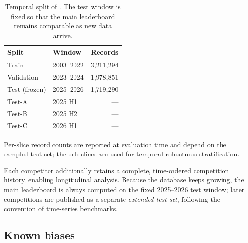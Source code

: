 \begin{table}[t]
  \centering
  \small
  \begin{threeparttable}
  \caption{Temporal split of \wcabench{}. The test window is fixed so that the
  main leaderboard remains comparable as new data arrive.}
  \label{tab:splits}
  \begin{tabular}{llr}
    \toprule
    Split & Window & Records \\
    \midrule
    Train & 2003--2022 & 3{,}211{,}294 \\
    Validation & 2023--2024 & 1{,}978{,}851 \\
    Test (frozen) & 2025--2026 & 1{,}719{,}290 \\
    \quad Test-A & 2025 H1 & --- \\
    \quad Test-B & 2025 H2 & --- \\
    \quad Test-C & 2026 H1 & --- \\
    \bottomrule
  \end{tabular}
  \begin{tablenotes}\footnotesize
    \item Per-slice record counts are reported at evaluation time and depend on
          the sampled test set; the sub-slices are used for temporal-robustness
          stratification.
  \end{tablenotes}
  \end{threeparttable}
\end{table}

Each competitor additionally retains a complete, time-ordered competition
history, enabling longitudinal analysis. Because the \wca{} database keeps
growing, the main leaderboard is always computed on the fixed 2025--2026 test
window; later competitions are published as a separate \emph{extended test
set}, following the convention of time-series benchmarks.

\subsection{Known biases}
\label{sec:data-biases}

